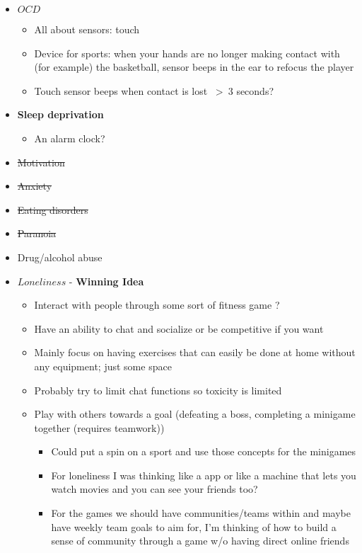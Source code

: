\documentclass{article}
\newcommand{\highlight}[1]{%
  \colorbox{yellowOrange}{$\displaystyle#1$}}
\begin{document}
\begin{itemize}
  \item \highlight{OCD}
  \begin{itemize}
    \item All about sensors: touch
    \item Device for sports: when your hands are no longer making contact with (for example) the basketball, sensor beeps in the ear to refocus the player
    \item Touch sensor beeps when contact is lost $\ >\ 3$ seconds?
  \end{itemize}
  \item \textbf{Sleep deprivation}
    \begin{itemize}
      \item An alarm clock?
    \end{itemize}
  \item \sout{Motivation}
  \item \sout{Anxiety}
  \item \sout{Eating disorders}
  \item \sout{Paranoia}
  \item Drug/alcohol abuse
  \item \highlight{Loneliness} - \textbf{Winning Idea}
  \begin{itemize}
    \item Interact with people through some sort of fitness game ?
    \item Have an ability to chat and socialize or be competitive if you want
    \item Mainly focus on having exercises that can easily be done at home without any equipment; just some space
    \item Probably try to limit chat functions so toxicity is limited
    \item Play with others towards a goal (defeating a boss, completing a minigame together (requires teamwork))
    \begin{itemize}
      \item Could put a spin on a sport and use those concepts for the minigames
      \item For loneliness I was thinking like a app or like a machine that lets you watch movies and you can see your friends too?
      \item For the games we should have communities/teams within and maybe have weekly team goals to aim for, I’m thinking of how to build a sense of community through a game w/o having direct online friends
    \end{itemize}

\end{itemize}
\end{itemize}
\end{document}
